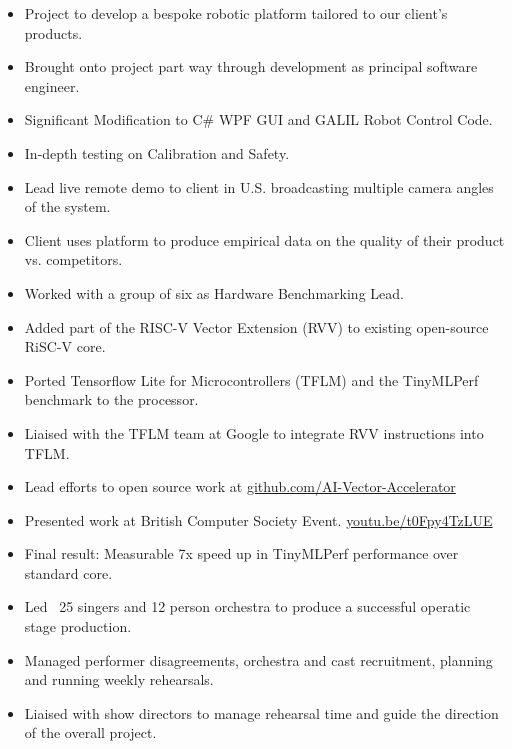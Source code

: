 {
  {\begin{itemize}
    \item Project to develop a bespoke robotic platform tailored to our client's products. 
    \item Brought onto project part way through development as principal software engineer.
    \item Significant Modification to C\# WPF GUI and GALIL Robot Control Code. 
    \item In-depth testing on Calibration and Safety. 
    \item Lead live remote demo to client in U.S. broadcasting multiple camera angles of the system. 
    \item Client uses platform to produce empirical data on the quality of their product vs. competitors.
  \end{itemize} 
  }
}

{
  {\begin{itemize}
    \item Worked with a group of six as Hardware Benchmarking Lead.
    \item Added part of the RISC-V Vector Extension (RVV) to existing open-source RiSC-V core.
    \item Ported Tensorflow Lite for Microcontrollers (TFLM) and the TinyMLPerf benchmark to the processor.
    \item Liaised with the TFLM team at Google to integrate RVV instructions into TFLM. 
    \item Lead efforts to open source work at \url{github.com/AI-Vector-Accelerator}
    \item Presented work at British Computer Society Event. \url{youtu.be/t0Fpy4TzLUE}
    \item Final result: Measurable 7x speed up in TinyMLPerf performance over standard core.
  \end{itemize} 
  }
}

{
  {\begin{itemize}
    \item Led ~25 singers and 12 person orchestra to produce a successful operatic stage production.
    \item Managed performer disagreements, orchestra and cast recruitment, planning and running weekly rehearsals.  
    \item Liaised with show directors to manage rehearsal time and guide the direction of the overall project.
  \end{itemize}
  }
}



